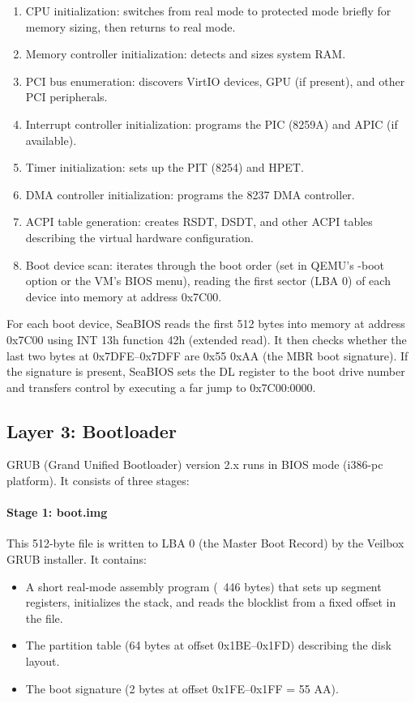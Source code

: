 \begin{enumerate}[nosep]
  \item CPU initialization: switches from real mode to protected mode briefly
        for memory sizing, then returns to real mode.
  \item Memory controller initialization: detects and sizes system RAM.
  \item PCI bus enumeration: discovers VirtIO devices, GPU (if present),
        and other PCI peripherals.
  \item Interrupt controller initialization: programs the PIC (8259A) and
        APIC (if available).
  \item Timer initialization: sets up the PIT (8254) and HPET.
  \item DMA controller initialization: programs the 8237 DMA controller.
  \item ACPI table generation: creates RSDT, DSDT, and other ACPI tables
        describing the virtual hardware configuration.
  \item Boot device scan: iterates through the boot order (set in QEMU's
        -boot option or the VM's BIOS menu), reading the first sector
        (LBA 0) of each device into memory at address 0x7C00.
\end{enumerate}

For each boot device, SeaBIOS reads the first 512 bytes into memory at
address 0x7C00 using INT 13h function 42h (extended read). It then checks
whether the last two bytes at 0x7DFE--0x7DFF are 0x55 0xAA (the MBR boot
signature). If the signature is present, SeaBIOS sets the DL register to
the boot drive number and transfers control by executing a far jump to
0x7C00:0000.

\subsection{Layer 3: Bootloader}

GRUB (Grand Unified Bootloader) version 2.x runs in BIOS mode (i386-pc
platform). It consists of three stages:

\paragraph{Stage 1: boot.img}
This 512-byte file is written to LBA 0 (the Master Boot Record) by the
Veilbox GRUB installer. It contains:

\begin{itemize}[nosep]
  \item A short real-mode assembly program (~446 bytes) that sets up segment
        registers, initializes the stack, and reads the blocklist from a
        fixed offset in the file.
  \item The partition table (64 bytes at offset 0x1BE--0x1FD) describing
        the disk layout.
  \item The boot signature (2 bytes at offset 0x1FE--0x1FF = 55 AA).
\end{itemize}

